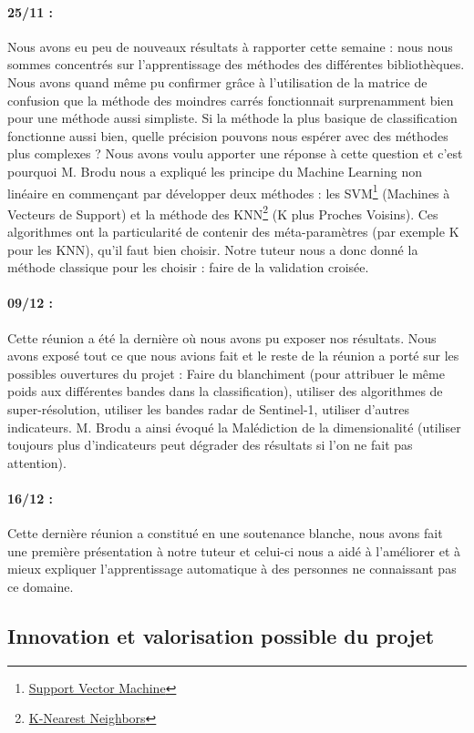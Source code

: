 \documentclass[a4paper,10pt]{article}
\begin{document}
\paragraph{25/11 :} Nous avons eu peu de nouveaux résultats à rapporter cette semaine : nous nous sommes concentrés sur l'apprentissage des méthodes des différentes bibliothèques. Nous avons quand même pu confirmer grâce à l'utilisation de la matrice de confusion que la méthode des moindres carrés fonctionnait surprenamment bien pour une méthode aussi simpliste. Si la méthode la plus basique de classification fonctionne aussi bien, quelle précision pouvons nous espérer avec des méthodes plus complexes ? Nous avons voulu apporter une réponse à cette question et c'est pourquoi M. Brodu nous a expliqué les principe du Machine Learning non linéaire en commençant par développer deux méthodes : les SVM\footnote{\href{https://en.wikipedia.org/wiki/Support_vector_machine}{Support Vector Machine}} (Machines à Vecteurs de Support) et la méthode des KNN\footnote{\href{https://en.wikipedia.org/wiki/K-nearest_neighbors_algorithm}{K-Nearest Neighbors}} (K plus Proches Voisins). Ces algorithmes ont la particularité de contenir des méta-paramètres (par exemple K pour les KNN), qu'il faut bien choisir. Notre tuteur nous a donc donné la méthode classique pour les choisir : faire de la validation croisée.
\paragraph{09/12 :} Cette réunion a été la dernière où nous avons pu exposer nos résultats. Nous avons exposé tout ce que nous avions fait et le reste de la réunion a porté sur les possibles ouvertures du projet : Faire du blanchiment (pour attribuer le même poids aux différentes bandes dans la classification), utiliser des algorithmes de super-résolution, utiliser les bandes radar de Sentinel-1, utiliser d'autres indicateurs. M. Brodu a ainsi évoqué la Malédiction de la dimensionalité (utiliser toujours plus d'indicateurs peut dégrader des résultats si l'on ne fait pas attention).
\paragraph{16/12 :}Cette dernière réunion a constitué en une soutenance blanche, nous avons fait une première présentation à notre tuteur et celui-ci nous a aidé à l'améliorer et à mieux expliquer l'apprentissage automatique à des personnes ne connaissant pas ce domaine.

\subsection{Innovation et valorisation possible du projet}
\end{document}
